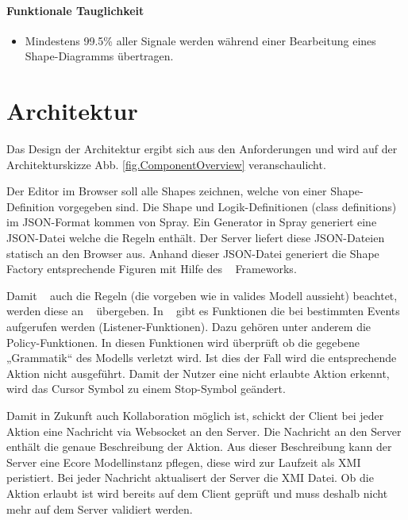 \paragraph{Funktionale Tauglichkeit}

\begin{itemize}
  \item Mindestens 99.5\% aller Signale werden während einer Bearbeitung eines Shape-Diagramms übertragen.
\end{itemize}



\section{Architektur}

Das Design der Architektur ergibt sich aus den Anforderungen
und wird auf der Architekturskizze Abb. \ref{fig.ComponentOverview}
veranschaulicht.

Der Editor im Browser soll alle Shapes zeichnen,
welche von einer Shape-Definition vorgegeben sind.
Die Shape und Logik-Definitionen (class definitions) im JSON-Format kommen von Spray.
Ein Generator in Spray generiert eine JSON-Datei welche die Regeln enthält.
Der Server liefert diese JSON-Dateien statisch an den Browser aus.
Anhand dieser JSON-Datei generiert die Shape Factory entsprechende Figuren
mit Hilfe des \dd~ Frameworks.

Damit \dd~ auch die Regeln (die vorgeben wie in valides Modell aussieht) beachtet,
werden diese an \dd~ übergeben.
In \dd~ gibt es Funktionen die bei bestimmten Events aufgerufen werden (Listener-Funktionen). Dazu gehören unter anderem die Policy-Funktionen.
In diesen Funktionen wird überprüft ob die gegebene „Grammatik“ des Modells
verletzt wird. Ist dies der Fall wird die entsprechende Aktion nicht ausgeführt.
Damit der Nutzer eine nicht erlaubte Aktion erkennt,
wird das Cursor Symbol zu einem Stop-Symbol geändert.

Damit in Zukunft auch Kollaboration möglich ist, schickt der Client bei jeder Aktion eine Nachricht via Websocket an den Server.
Die Nachricht an den Server enthält die genaue Beschreibung der Aktion.
Aus dieser Beschreibung kann der Server eine Ecore Modellinstanz pflegen,
diese wird zur Laufzeit als XMI peristiert. Bei jeder Nachricht aktualisert
der Server die XMI Datei.
Ob die Aktion erlaubt ist wird bereits auf dem Client geprüft und muss deshalb nicht mehr auf dem Server validiert werden.
\\\\

